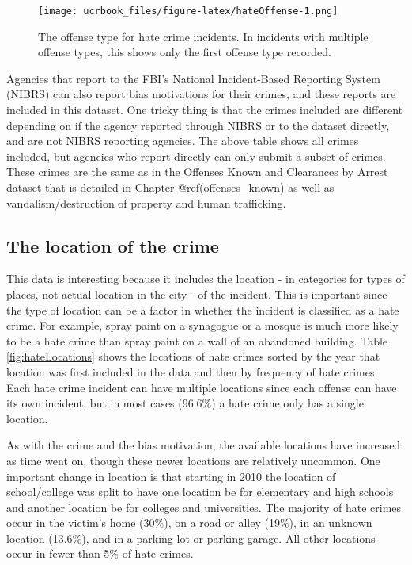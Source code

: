 \documentclass[
  12pt,
  openany]{book}
\begin{document}
\begin{figure}
\centering
\texttt{[image: ucrbook\_files/figure-latex/hateOffense-1.png]}
\caption{\label{fig:hateOffense}The offense type for hate crime incidents. In incidents with multiple offense types, this shows only the first offense type recorded.}
\end{figure}

Agencies that report to the FBI's National Incident-Based Reporting System (NIBRS) can also report bias motivations for their crimes, and these reports are included in this dataset. One tricky thing is that the crimes included are different depending on if the agency reported through NIBRS or to the dataset directly, and are not NIBRS reporting agencies. The above table shows all crimes included, but agencies who report directly can only submit a subset of crimes. These crimes are the same as in the Offenses Known and Clearances by Arrest dataset that is detailed in Chapter @ref(offenses\_known) as well as vandalism/destruction of property and human trafficking.

\hypertarget{the-location-of-the-crime}{%
\subsection{The location of the crime}\label{the-location-of-the-crime}}

This data is interesting because it includes the location - in categories for types of places, not actual location in the city - of the incident. This is important since the type of location can be a factor in whether the incident is classified as a hate crime. For example, spray paint on a synagogue or a mosque is much more likely to be a hate crime than spray paint on a wall of an abandoned building. Table \ref{fig:hateLocations} shows the locations of hate crimes sorted by the year that location was first included in the data and then by frequency of hate crimes. Each hate crime incident can have multiple locations since each offense can have its own incident, but in most cases (96.6\%) a hate crime only has a single location.

As with the crime and the bias motivation, the available locations have increased as time went on, though these newer locations are relatively uncommon. One important change in location is that starting in 2010 the location of school/college was split to have one location be for elementary and high schools and another location be for colleges and universities. The majority of hate crimes occur in the victim's home (30\%), on a road or alley (19\%), in an unknown location (13.6\%), and in a parking lot or parking garage. All other locations occur in fewer than 5\% of hate crimes.
\end{document}
